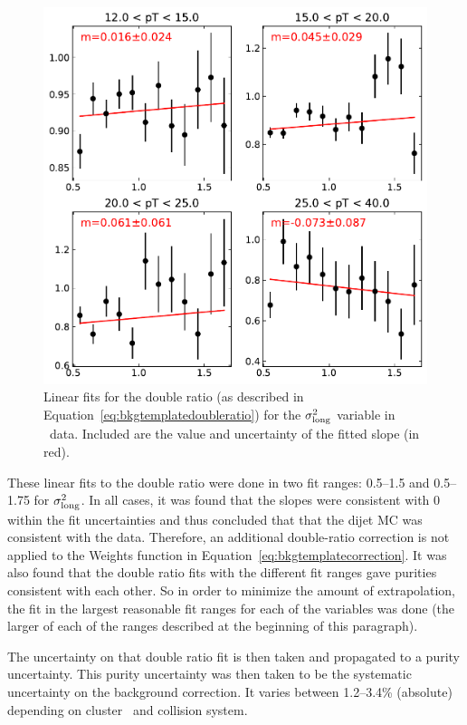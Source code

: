 \begin{figure}[htpb]
    \centering
    \includegraphics[width=\textwidth]{Data_Analysis/Purity/single-linear-fits-p-Pb}
    \caption{Linear fits for the double ratio (as described in Equation~\ref{eq:bkgtemplatedoubleratio}) for the $\sigma^{2}_{\mathrm{long}}$ variable in \pPb~data.  Included are the value and uncertainty of the fitted slope (in red).}
    \label{fig:bkgtemplatedoubleratiofits_pPb}
\end{figure}

These linear fits to the double ratio were done in two fit ranges: 0.5--1.5 and 0.5--1.75 for $\sigma^{2}_{\mathrm{long}}$. In all cases, it was found that the slopes were consistent with 0 within the fit uncertainties and thus concluded that that the dijet MC was consistent with the data. Therefore, an additional double-ratio correction is not applied to the Weights function in Equation~\ref{eq:bkgtemplatecorrection}. It was also found that the double ratio fits with the different fit ranges gave purities consistent with each other. So in order to minimize the amount of extrapolation, the fit in the largest reasonable fit ranges for each of the variables was done (the larger of each of the ranges described at the beginning of this paragraph). 

The uncertainty on that double ratio fit is then taken and propagated to a purity uncertainty. This purity uncertainty was then taken to be the systematic uncertainty on the background correction. It varies between 1.2--3.4\% (absolute) depending on cluster \pt~and collision system.



